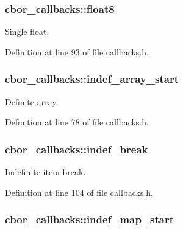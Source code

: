 \hypertarget{structcbor__callbacks_a5a80bae7d106e7cf61d27cd710251e4a}{
\subsubsection[{float8}]{ cbor\-\_\-callbacks\-::float8}}\label{structcbor__callbacks_a5a80bae7d106e7cf61d27cd710251e4a}


Single float. 



Definition at line 93 of file callbacks.\-h.

\hypertarget{structcbor__callbacks_a5831fd6bd9372b04a8f65db1e1967713}{
\subsubsection[{indef\-\_\-array\-\_\-start}]{ cbor\-\_\-callbacks\-::indef\-\_\-array\-\_\-start}}\label{structcbor__callbacks_a5831fd6bd9372b04a8f65db1e1967713}


Definite array. 



Definition at line 78 of file callbacks.\-h.

\hypertarget{structcbor__callbacks_abc0516d80611473d2527bf5faea393d8}{
\subsubsection[{indef\-\_\-break}]{ cbor\-\_\-callbacks\-::indef\-\_\-break}}\label{structcbor__callbacks_abc0516d80611473d2527bf5faea393d8}


Indefinite item break. 



Definition at line 104 of file callbacks.\-h.

\hypertarget{structcbor__callbacks_ab989b168f43559f404d87508bdd0ddc8}{
\subsubsection[{indef\-\_\-map\-\_\-start}]{ cbor\-\_\-callbacks\-::indef\-\_\-map\-\_\-start}}\label{structcbor__callbacks_ab989b168f43559f404d87508bdd0ddc8}


